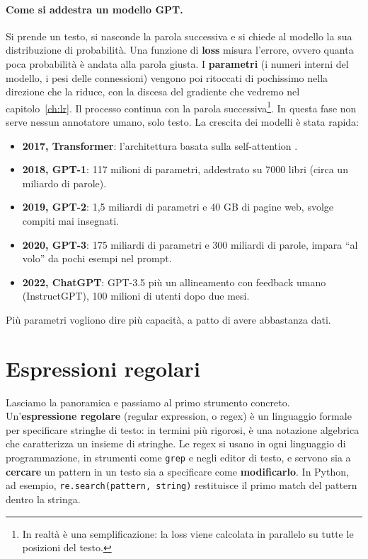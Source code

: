 \paragraph{Come si addestra un modello GPT.} Si prende un testo, si nasconde la parola successiva e si chiede al modello la sua distribuzione di probabilità. Una funzione di \textbf{loss} misura l'errore, ovvero quanta poca probabilità è andata alla parola giusta. I \textbf{parametri} (i numeri interni del modello, i pesi delle connessioni) vengono poi ritoccati di pochissimo nella direzione che la riduce, con la discesa del gradiente che vedremo nel capitolo~\ref{ch:lr}. Il processo continua con la parola successiva\footnote{In realtà è una semplificazione: la loss viene calcolata in parallelo su tutte le posizioni del testo.}. In questa fase non serve nessun annotatore umano, solo testo. La crescita dei modelli è stata rapida:
\begin{itemize}
    \item \textbf{2017, Transformer}: l'architettura basata sulla self-attention \cite{vaswani2017attention}.
    \item \textbf{2018, GPT-1}: 117 milioni di parametri, addestrato su 7000 libri (circa un miliardo di parole).
    \item \textbf{2019, GPT-2}: 1,5 miliardi di parametri e 40 GB di pagine web, svolge compiti mai insegnati.
    \item \textbf{2020, GPT-3}: 175 miliardi di parametri e 300 miliardi di parole, impara \enquote{al volo} da pochi esempi nel prompt.
    \item \textbf{2022, ChatGPT}: GPT-3.5 più un allineamento con feedback umano (InstructGPT), 100 milioni di utenti dopo due mesi.
\end{itemize}
Più parametri vogliono dire più capacità, a patto di avere abbastanza dati.

\section{Espressioni regolari}\label{sec:regex}
Lasciamo la panoramica e passiamo al primo strumento concreto. Un'\textbf{espressione regolare} (regular expression, o regex) è un linguaggio formale per specificare stringhe di testo: in termini più rigorosi, è una notazione algebrica che caratterizza un insieme di stringhe. Le regex si usano in ogni linguaggio di programmazione, in strumenti come \texttt{grep} e negli editor di testo, e servono sia a \textbf{cercare} un pattern in un testo sia a specificare come \textbf{modificarlo}. In Python, ad esempio, \verb|re.search(pattern, string)| restituisce il primo match del pattern dentro la stringa.

